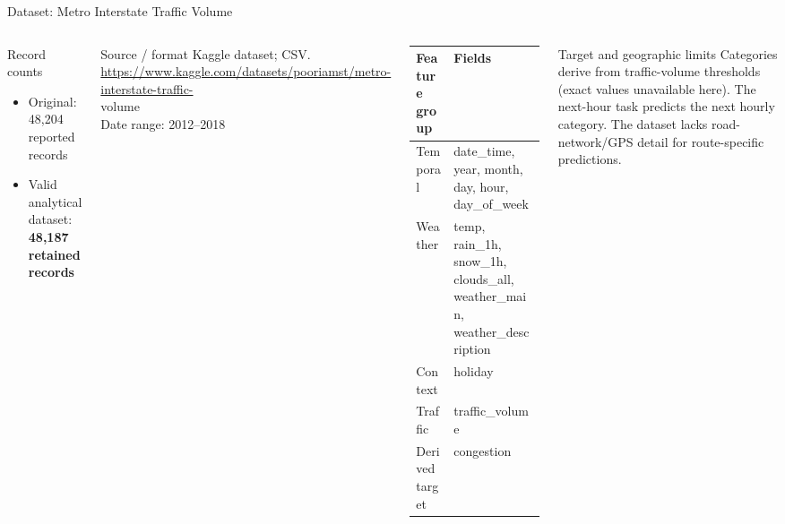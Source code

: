 \documentclass[aspectratio=169,11pt]{beamer}
\begin{document}
\begin{frame}{Dataset: Metro Interstate Traffic Volume}
\begin{columns}[T,onlytextwidth]
\begin{block}{Record counts}
\begin{itemize}
\item Original: 48,204 reported records
\item Valid analytical dataset: \textbf{48,187 retained records}
\end{itemize}
\end{block}
\begin{block}{Source / format}
Kaggle dataset; CSV.\\
\url{https://www.kaggle.com/datasets/pooriamst/metro-interstate-traffic-}\\
volume\\
Date range: 2012--2018
\end{block}
\small %
\begin{tabularx}{\textwidth}{>{\raggedright\arraybackslash}p{} X}
\toprule
\textbf{Feature group} & \textbf{Fields} \\
\midrule
Temporal & date\_time, year, month, day, hour, day\_of\_week \\
Weather & temp, rain\_1h, snow\_1h, clouds\_all, weather\_main, weather\_description \\
Context & holiday \\
Traffic & traffic\_volume \\
Derived target & congestion \\
\bottomrule
\end{tabularx}
\vspace{1mm} %
\begin{alertblock}{Target and geographic limits}
Categories derive from traffic-volume thresholds (exact values unavailable here). The next-hour task predicts the next hourly category. The dataset lacks road-network/GPS detail for route-specific predictions.
\end{alertblock}
\end{columns}
\end{frame}
\end{document}
